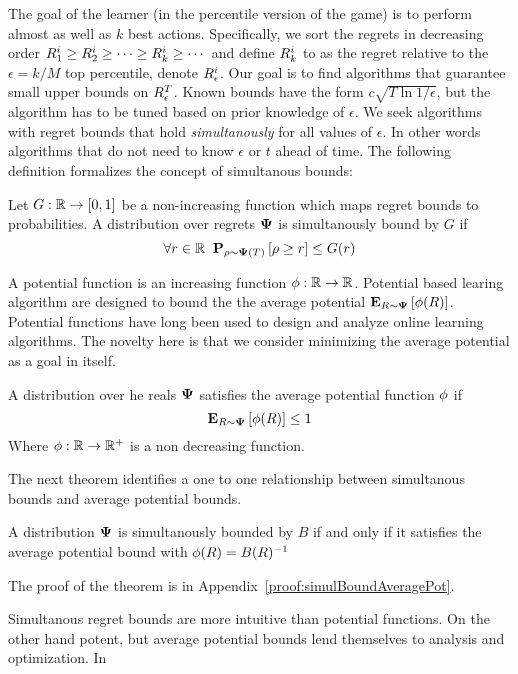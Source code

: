 \documentclass{article}[12pt]
\begin{document}
The goal of the learner (in the percentile version of the game) is to
perform almost as well as $k$ best actions. Specifically, we sort the
regrets in decreasing order
$R_1^i \geq R_2^i \geq \cdots \geq R_k^i \geq \cdots$ and define
$R_k^i$ to as the regret relative to the $\epsilon=k/M$ top
percentile, denote $R_\epsilon^i$. Our goal is to find algorithms
that guarantee small upper bounds on $R_\epsilon^T$. Known bounds
have the form $c \sqrt{T \ln {1/\epsilon}}$, but the algorithm has to
be tuned based on prior knowledge of $\epsilon$. We seek algorithms
with regret bounds that hold {\em simultanously} for all values of
$\epsilon$. In other words algorithms that do not need to know
$\epsilon$ or $t$ ahead of time. The following definition formalizes
the concept of simultanous bounds:
\begin{definition} \label{def:unif-regret-bound} Let $G: \mathbb{R} \to [0,1]$ be a
  non-increasing function which maps regret bounds to probabilities.
  A distribution over regrets ${\bf \Psi}$ is simultanously bound by $G$ if
  \[
    \forall r \in \mathbb{R} \;\; {\bf P}_{\rho \sim {\bf \Psi}(T)}\left[ \rho \geq r \right] \leq G(r)
  \]
\end{definition}


A potential function is an increasing function
$\phi:\mathbb{R} \to \mathbb{R}$. Potential based learing algorithm are
designed to bound the the average potential
${\bf E}_{R \sim {\bf \Psi}}\left[ \phi(R) \right]$. Potential functions have long been
used to design and analyze online learning algorithms. The novelty 
here is that we consider minimizing the average potential as a goal in itself.
\begin{definition} \label{def:aver-potential-bound}
  A distribution over he reals ${\bf \Psi}$ satisfies the average
  potential function $\phi$ if
  $${\bf E}_{R \sim {\bf \Psi}}\left[ \phi(R) \right] \leq 1$$
  Where $\phi: \mathbb{R} \to \mathbb{R}^+$ is a non decreasing function. 
\end{definition}

The next theorem identifies a one to one relationship between
simultanous bounds and average potential bounds. 
\begin{theorem}\label{thm:simulBoundAveragePot}
 A distribution ${\bf \Psi}$ is simultanously bounded by $B$ if and only
 if it satisfies the average potential bound with $\phi(R) = B(R)^{-1}$
\end{theorem}
The proof of the theorem is in Appendix~\ref{proof:simulBoundAveragePot}.

Simultanous regret bounds are more intuitive than potential
functions. On the other hand potent, but average potential
bounds lend themselves to analysis and optimization. In 
\end{document}
